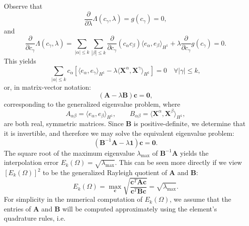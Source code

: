 Observe that
\begin{equation}
        \frac{\partial}{\partial \lambda} \Lambda (c_\gamma, \lambda) = g(c_\gamma) = 0,
\end{equation}
and
\begin{equation}
        \frac{\partial}{\partial c_\gamma} \Lambda (c_\gamma, \lambda) = \sum_{|\alpha| \leq k} \sum_{|\beta| \leq k} \frac{\partial}{\partial c_\gamma} (c_{\alpha} c_{\beta}) \langle e_\alpha, e_\beta \rangle_{H^1} + \lambda \frac{\partial}{\partial c_\gamma} g(c_\gamma) = 0.
\end{equation}
This yields
\begin{equation}
        \sum_{|\alpha| \leq k} c_{\alpha} \left[ \langle e_\alpha, e_\gamma \rangle_{H^1} - \lambda \langle \mathbf{X}^\alpha, \mathbf{X}^\gamma \rangle_{H^1} \right] = 0 \quad \forall |\gamma| \leq k,
\end{equation}
or, in matrix-vector notation:
\begin{equation}
        (\mathbf{A} - \lambda \mathbf{B}) \mathbf{c} = \mathbf{0},
\end{equation}
corresponding to the generalized eigenvalue problem, where
\begin{equation}
        A_{\alpha \beta} = \langle e_\alpha, e_\beta \rangle_{H^1}, \qquad B_{\alpha \beta} = \langle \mathbf{X}^\alpha, \mathbf{X}^\beta \rangle_{H^1},
\end{equation}
are both real, symmetric matrices. Since $\mathbf{B}$ is positive-definite, we determine that it is invertible, and therefore we may solve the equivalent eigenvalue problem:
\begin{equation}
        (\mathbf{B}^{-1} \mathbf{A} - \lambda \mathbf{1}) \mathbf{c} = \mathbf{0}.
\end{equation}
The square root of the maximum eigenvalue $\lambda_{\max}$ of $\mathbf{B}^{-1} \mathbf{A}$ yields the interpolation error $E_k (\Omega) = \sqrt{\lambda_{\max}}$. This can be seen more directly if we view $\left[ E_k (\Omega) \right]^2$ to be the generalized Rayleigh quotient of $\mathbf{A}$ and $\mathbf{B}$:
\begin{equation}
        E_k (\Omega) = \max_{\mathbf{c}} \sqrt{\frac{\mathbf{c}^T \mathbf{A} \mathbf{c}}{\mathbf{c}^T \mathbf{B} \mathbf{c}}} = \sqrt{\lambda_{\max}}.
\end{equation}
For simplicity in the numerical computation of $E_k (\Omega)$, we assume that the entries of $\mathbf{A}$ and $\mathbf{B}$ will be computed approximately using the element's quadrature rules, i.e.
